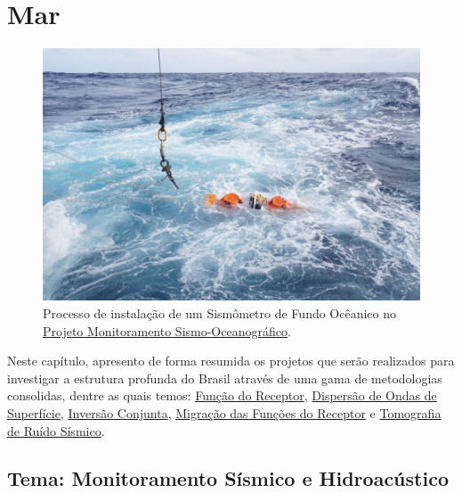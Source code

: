 \documentclass[10pt,a4paper,oneside]{book}
\newcommand{\HeroFigPad}{\vspace{-1cm}}
\begin{document}

\chapter{Mar}
\label{cap_mar}

\begin{figure}[h]
	\HeroFigPad
	\begin{center}
		\includegraphics[width=\textwidth]{images/obs_foto.jpeg}
	\end{center}
	\caption{
	Processo de instalação de um Sismômetro de Fundo Ocêanico no \href{https://sismo-oceano.ufsc.br/}{Projeto Monitoramento Sismo-Oceanográfico}.
    }
 \label{fig_obs}
\end{figure}

Neste capítulo, apresento de forma resumida os projetos que serão realizados para investigar a estrutura profunda do Brasil através de uma gama de metodologias consolidas, dentre as quais temos: \href{https://doi.org/10.1029/JB084iB09p04749}{Função do Receptor}, \href{https://doi.org/10.1111/j.1365-246X.1990.tb04573.x}{Dispersão de Ondas de Superfície}, \href{https://doi.org/10.1046/j.1365-246x.2000.00217.x}{Inversão Conjunta}, \href{https://doi.org/10.1016/j.epsl.2013.08.025}{Migração das Funções do Receptor} e \href{https://doi.org/10.1111/j.1365-246X.2007.03374.x}{Tomografia de Ruído Sísmico}.   

\section{Tema: Monitoramento Sísmico e Hidroacústico}
\end{document}
